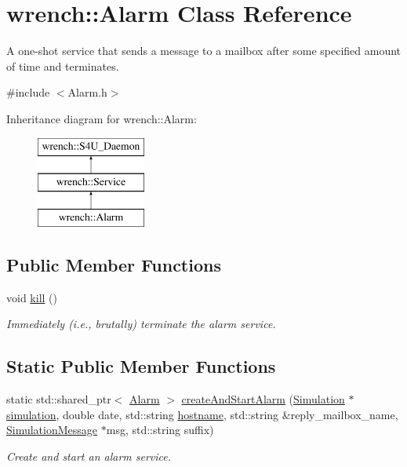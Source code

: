 \hypertarget{classwrench_1_1_alarm}{}\section{wrench\+:\+:Alarm Class Reference}
\label{classwrench_1_1_alarm}


A one-\/shot service that sends a message to a mailbox after some specified amount of time and terminates.  




{\ttfamily \#include $<$Alarm.\+h$>$}

Inheritance diagram for wrench\+:\+:Alarm\+:\begin{figure}[H]
\begin{center}
\leavevmode
\includegraphics[height=3.000000cm]{classwrench_1_1_alarm}
\end{center}
\end{figure}
\subsection*{Public Member Functions}
\begin{DoxyCompactItemize}
\item 
\mbox{\label{classwrench_1_1_alarm_a6d0595e6d53d39704c2b04522b791b9d}} 
void \hyperlink{classwrench_1_1_alarm_a6d0595e6d53d39704c2b04522b791b9d}{kill} ()
\begin{DoxyCompactList}\small\item\em Immediately (i.\+e., brutally) terminate the alarm service. \end{DoxyCompactList}\end{DoxyCompactItemize}
\subsection*{Static Public Member Functions}
\begin{DoxyCompactItemize}
\item 
static std\+::shared\+\_\+ptr$<$ \hyperlink{classwrench_1_1_alarm}{Alarm} $>$ \hyperlink{classwrench_1_1_alarm_aa786b7b67c563e7eea3d02ed4838fb9e}{create\+And\+Start\+Alarm} (\hyperlink{classwrench_1_1_simulation}{Simulation} $\ast$\hyperlink{classwrench_1_1_s4_u___daemon_a305beca7ad2fb650ad1492b7c95e93c4}{simulation}, double date, std\+::string \hyperlink{classwrench_1_1_s4_u___daemon_a52bc0b9a6cd248310749dac086819f00}{hostname}, std\+::string \&reply\+\_\+mailbox\+\_\+name, \hyperlink{classwrench_1_1_simulation_message}{Simulation\+Message} $\ast$msg, std\+::string suffix)
\begin{DoxyCompactList}\small\item\em Create and start an alarm service. \end{DoxyCompactList}\end{DoxyCompactItemize}
